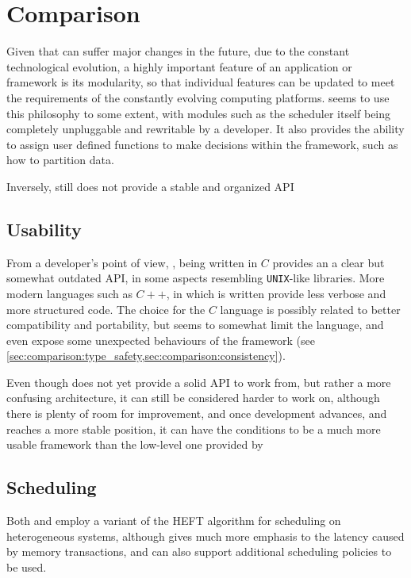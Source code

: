 \documentclass[main.tex]{subfiles}
\begin{document}
\section{Comparison} \label{sec:comparison}

Given that \hetplats can suffer major changes in the future, due to the constant technological evolution, a highly important feature of an application or framework is its modularity, so that individual features can be updated to meet the requirements of the constantly evolving computing platforms. \starpu seems to use this philosophy to some extent, with modules such as the scheduler itself being completely unpluggable and rewritable by a developer. It also provides the ability to assign user defined functions to make decisions within the framework, such as how to partition data.

Inversely, \gama still does not provide a stable and organized API

\subsection{Usability}

From a developer's point of view, \starpu, being written in $C$ provides an a clear but somewhat outdated API, in some aspects resembling \texttt{UNIX}-like libraries. More modern languages such as $C++$, in which \gama is written provide less verbose and more structured code. The choice for the $C$ language is possibly related to better compatibility and portability, but seems to somewhat limit the language, and even expose some unexpected behaviours of the framework (see \cref{sec:comparison:type_safety,sec:comparison:consistency}).

Even though \gama does not yet provide a solid API to work from, but rather a more confusing architecture, it can still be considered harder to work on, although there is plenty of room for improvement, and once development advances, and reaches a more stable position, it can have the conditions to be a much more usable framework than the low-level one provided by \starpu

\subsection{Scheduling}

Both \starpu and \gama employ a variant of the \acs{HEFT} algorithm for scheduling on heterogeneous systems, although \starpu gives much more emphasis to the latency caused by memory transactions, and can also support additional scheduling policies to be used.
\end{document}
